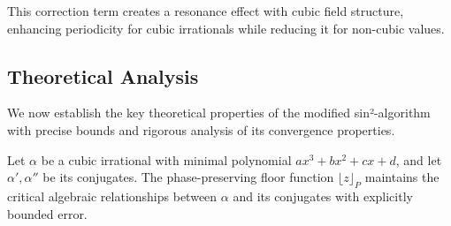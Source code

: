 This correction term creates a resonance effect with cubic field structure, enhancing periodicity for cubic irrationals while reducing it for non-cubic values.

\subsection{Theoretical Analysis}

We now establish the key theoretical properties of the modified sin²-algorithm with precise bounds and rigorous analysis of its convergence properties.

\begin{lemma}\label{lem:algebraic_preservation}
Let $\alpha$ be a cubic irrational with minimal polynomial $ax^3 + bx^2 + cx + d$, and let $\alpha', \alpha''$ be its conjugates. The phase-preserving floor function $\lfloor z \rfloor_P$ maintains the critical algebraic relationships between $\alpha$ and its conjugates with explicitly bounded error.
\end{lemma}

